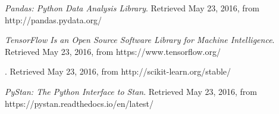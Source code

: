 \documentclass[]{article}
\begin{document}
\begin{thebibliography}{25}
 {\em Pandas: Python Data Analysis Library}. Retrieved May 23, 2016, from http://pandas.pydata.org/

 {\em TensorFlow Is an Open Source Software Library for Machine Intelligence}. Retrieved May 23, 2016, from https://www.tensorflow.org/

. Retrieved May 23, 2016, from http://scikit-learn.org/stable/

 {\em PyStan: The Python Interface to Stan}. Retrieved May 23, 2016, from https://pystan.readthedocs.io/en/latest/

\end{thebibliography}
\end{document}
